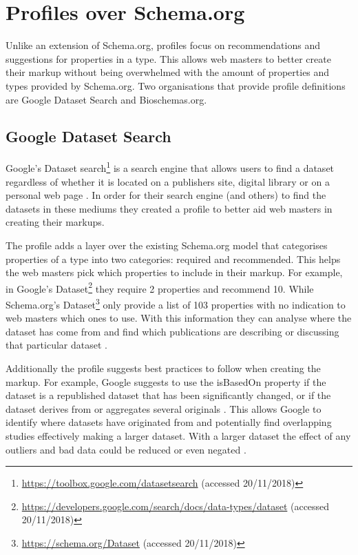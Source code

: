 \section{Profiles over Schema.org}
Unlike an extension of Schema.org, profiles focus on recommendations and suggestions for properties in a type. This allows web masters to better create their markup without being overwhelmed with the amount of properties and types provided by Schema.org. Two organisations that provide profile definitions are Google Dataset Search and Bioschemas.org.

\subsection{Google Dataset Search}
Google's Dataset search\footnote{\url{https://toolbox.google.com/datasetsearch} (accessed 20/11/2018)} is a search engine that allows users to find a dataset regardless of whether it is located on a publishers site, digital library or on a personal web page \cite{blogGoogleData}. In order for their search engine (and others) to find the datasets in these mediums they created a profile to better aid web masters in creating their markups.  

The profile adds a layer over the existing Schema.org model that categorises properties of a type into two categories: required and recommended. This helps the web masters pick which properties to include in their markup. For example, in Google's Dataset\footnote{\url{https://developers.google.com/search/docs/data-types/dataset} (accessed 20/11/2018)} they require 2 properties and recommend 10. While Schema.org's Dataset\footnote{\url{https://schema.org/Dataset} (accessed 20/11/2018)} only provide a list of 103 properties with no indication to web masters which ones to use. With this information they can analyse where the dataset has come from and find which publications are describing or discussing that particular dataset \cite{googleDatasetBlog}.

Additionally the profile suggests best practices to follow when creating the markup. For example, Google suggests to use the isBasedOn property if the dataset is a republished dataset that has been significantly changed, or if the dataset derives from or aggregates several originals \cite{googleDataset}. This allows Google to identify where datasets have originated from and potentially find overlapping studies effectively making a larger dataset. With a larger dataset the effect of any outliers and bad data could be reduced or even negated \cite{googleDatasetCMS}.


